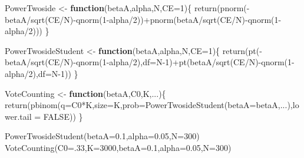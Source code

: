 \documentclass[
]{book}
\newenvironment{Shaded}{\begin{snugshade}}{\end{snugshade}}
\newcommand{\AttributeTok}[1]{\textcolor[rgb]{0.77,0.63,0.00}{#1}}
\newcommand{\ConstantTok}[1]{\textcolor[rgb]{0.00,0.00,0.00}{#1}}
\newcommand{\ControlFlowTok}[1]{\textcolor[rgb]{0.13,0.29,0.53}{\textbf{#1}}}
\newcommand{\DecValTok}[1]{\textcolor[rgb]{0.00,0.00,0.81}{#1}}
\newcommand{\FloatTok}[1]{\textcolor[rgb]{0.00,0.00,0.81}{#1}}
\newcommand{\FunctionTok}[1]{\textcolor[rgb]{0.00,0.00,0.00}{#1}}
\newcommand{\NormalTok}[1]{#1}
\newcommand{\OtherTok}[1]{\textcolor[rgb]{0.56,0.35,0.01}{#1}}
\newcommand{\SpecialCharTok}[1]{\textcolor[rgb]{0.00,0.00,0.00}{#1}}
\theoremstyle{definition}
\theoremstyle{definition}
\theoremstyle{definition}
\theoremstyle{definition}
\theoremstyle{remark}
\begin{document}
\begin{Shaded}
\begin{Highlighting}[]
\NormalTok{PowerTwoside }\OtherTok{\textless{}{-}} \ControlFlowTok{function}\NormalTok{(betaA,alpha,N,}\AttributeTok{CE=}\DecValTok{1}\NormalTok{)\{}
  \FunctionTok{return}\NormalTok{(}\FunctionTok{pnorm}\NormalTok{(}\SpecialCharTok{{-}}\NormalTok{betaA}\SpecialCharTok{/}\FunctionTok{sqrt}\NormalTok{(CE}\SpecialCharTok{/}\NormalTok{N)}\SpecialCharTok{{-}}\FunctionTok{qnorm}\NormalTok{(}\DecValTok{1}\SpecialCharTok{{-}}\NormalTok{alpha}\SpecialCharTok{/}\DecValTok{2}\NormalTok{))}\SpecialCharTok{+}\FunctionTok{pnorm}\NormalTok{(betaA}\SpecialCharTok{/}\FunctionTok{sqrt}\NormalTok{(CE}\SpecialCharTok{/}\NormalTok{N)}\SpecialCharTok{{-}}\FunctionTok{qnorm}\NormalTok{(}\DecValTok{1}\SpecialCharTok{{-}}\NormalTok{alpha}\SpecialCharTok{/}\DecValTok{2}\NormalTok{)))}
\NormalTok{\}}

\NormalTok{PowerTwosideStudent }\OtherTok{\textless{}{-}} \ControlFlowTok{function}\NormalTok{(betaA,alpha,N,}\AttributeTok{CE=}\DecValTok{1}\NormalTok{)\{}
  \FunctionTok{return}\NormalTok{(}\FunctionTok{pt}\NormalTok{(}\SpecialCharTok{{-}}\NormalTok{betaA}\SpecialCharTok{/}\FunctionTok{sqrt}\NormalTok{(CE}\SpecialCharTok{/}\NormalTok{N)}\SpecialCharTok{{-}}\FunctionTok{qnorm}\NormalTok{(}\DecValTok{1}\SpecialCharTok{{-}}\NormalTok{alpha}\SpecialCharTok{/}\DecValTok{2}\NormalTok{),}\AttributeTok{df=}\NormalTok{N}\DecValTok{{-}1}\NormalTok{)}\SpecialCharTok{+}\FunctionTok{pt}\NormalTok{(betaA}\SpecialCharTok{/}\FunctionTok{sqrt}\NormalTok{(CE}\SpecialCharTok{/}\NormalTok{N)}\SpecialCharTok{{-}}\FunctionTok{qnorm}\NormalTok{(}\DecValTok{1}\SpecialCharTok{{-}}\NormalTok{alpha}\SpecialCharTok{/}\DecValTok{2}\NormalTok{),}\AttributeTok{df=}\NormalTok{N}\DecValTok{{-}1}\NormalTok{))}
\NormalTok{\}}

\NormalTok{VoteCounting }\OtherTok{\textless{}{-}} \ControlFlowTok{function}\NormalTok{(betaA,C0,K,...)\{}
  \FunctionTok{return}\NormalTok{(}\FunctionTok{pbinom}\NormalTok{(}\AttributeTok{q=}\NormalTok{C0}\SpecialCharTok{*}\NormalTok{K,}\AttributeTok{size=}\NormalTok{K,}\AttributeTok{prob=}\FunctionTok{PowerTwosideStudent}\NormalTok{(}\AttributeTok{betaA=}\NormalTok{betaA,...),}\AttributeTok{lower.tail =} \ConstantTok{FALSE}\NormalTok{))}
\NormalTok{\}}

\FunctionTok{PowerTwosideStudent}\NormalTok{(}\AttributeTok{betaA=}\FloatTok{0.1}\NormalTok{,}\AttributeTok{alpha=}\FloatTok{0.05}\NormalTok{,}\AttributeTok{N=}\DecValTok{300}\NormalTok{)}
\FunctionTok{VoteCounting}\NormalTok{(}\AttributeTok{C0=}\NormalTok{.}\DecValTok{33}\NormalTok{,}\AttributeTok{K=}\DecValTok{3000}\NormalTok{,}\AttributeTok{betaA=}\FloatTok{0.1}\NormalTok{,}\AttributeTok{alpha=}\FloatTok{0.05}\NormalTok{,}\AttributeTok{N=}\DecValTok{300}\NormalTok{)}


\end{Highlighting}
\end{Shaded}
\end{document}
